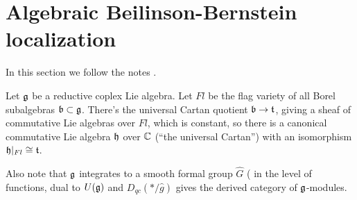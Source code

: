 \section{Algebraic Beilinson-Bernstein localization}

In this section we follow the notes \cite{ScholzeReal}.

Let $\mathfrak{g}$ be a reductive coplex Lie algebra.
Let $Fl$ be the flag variety of all Borel subalgebras $\mathfrak{b} \subset \mathfrak{g}$. 
There's the universal Cartan quotient $\mathfrak{b} \rightarrow \mathfrak{t}$, giving a sheaf of
commutative Lie algebras over $Fl$, which is constant, so there is a canonical
commutative Lie algebra $\mathfrak{h}$ over $\mathbb{C}$ (\enquote{the universal Cartan}) with
an isomorphism $\mathfrak{h}|_{Fl} \cong \mathfrak{t}$.

Also note that $\mathfrak{g}$ integrates to a smooth formal group $\hat{G}$ ( in the
level of functions, dual to $U(\mathfrak{g})$ and $D_{qc} (* / \hat{g})$ gives the
derived category of $\mathfrak{g}$-modules.
